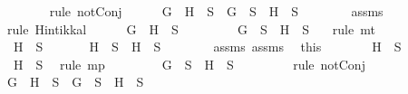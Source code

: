 \begin{isabellebody}
\ \ \ \ \ \ \isamarkupfalse%
\ {\isacharparenleft}rule\ notConj{}{\isacharparenright}\isanewline
\ \ \ \ \isamarkupfalse%
\ {\isachardoublequoteopen}G\ \isactrlbold {\isasymand}\ H\ {\isasymin}\ S\ {\isasymlongrightarrow}\ G\ {\isasymin}\ S\ {\isasymand}\ H\ {\isasymin}\ S{\isachardoublequoteclose}\isanewline
\ \ \ \ \ \ \isamarkupfalse%
\ assms{\isacharparenleft}{}{\isacharparenright}\ \isamarkupfalse%
\ {\isacharparenleft}rule\ Hintikka{\isacharunderscore}l{}{\isacharparenright}\isanewline
\ \ \ \ \isamarkupfalse%
\ {\isachardoublequoteopen}G\ \isactrlbold {\isasymand}\ H\ {\isasymnotin}\ S{\isachardoublequoteclose}\isanewline
\ \ \ \ \ \ \isamarkupfalse%
\ {\isacartoucheopen}{\isasymnot}\ {\isacharparenleft}G\ {\isasymin}\ S\ {\isasymand}\ H\ {\isasymin}\ S{\isacharparenright}{\isacartoucheclose}\ \ \isamarkupfalse%
\ {\isacharparenleft}rule\ mt{\isacharparenright}\isanewline
\ \ \isamarkupfalse%
\isanewline
\ \ \ \ \isamarkupfalse%
\ {\isachardoublequoteopen}\isactrlbold {\isasymnot}\ H\ {\isasymin}\ S{\isachardoublequoteclose}\isanewline
\ \ \ \ \isamarkupfalse%
\ {\isachardoublequoteopen}\isactrlbold {\isasymnot}\ H\ {\isasymin}\ S\ {\isasymlongrightarrow}\ H\ {\isasymnotin}\ S{\isachardoublequoteclose}\isanewline
\ \ \ \ \ \ \isamarkupfalse%
\ assms{\isacharparenleft}{}{\isacharparenright}\ assms{\isacharparenleft}{}{\isacharparenright}\ \isamarkupfalse%
\ this\isanewline
\ \ \ \ \isamarkupfalse%
\ \isamarkupfalse%
\ {\isachardoublequoteopen}H\ {\isasymnotin}\ S{\isachardoublequoteclose}\isanewline
\ \ \ \ \ \ \isamarkupfalse%
\ {\isacartoucheopen}\isactrlbold {\isasymnot}\ H\ {\isasymin}\ S{\isacartoucheclose}\ \isamarkupfalse%
\ {\isacharparenleft}rule\ mp{\isacharparenright}\isanewline
\ \ \ \ \isamarkupfalse%
\ \isamarkupfalse%
\ {\isachardoublequoteopen}{\isasymnot}\ {\isacharparenleft}G\ {\isasymin}\ S\ {\isasymand}\ H\ {\isasymin}\ S{\isacharparenright}{\isachardoublequoteclose}\ \isanewline
\ \ \ \ \ \ \isamarkupfalse%
\ {\isacharparenleft}rule\ notConj{}{\isacharparenright}\isanewline
\ \ \ \ \isamarkupfalse%
\ {\isachardoublequoteopen}G\ \isactrlbold {\isasymand}\ H\ {\isasymin}\ S\ {\isasymlongrightarrow}\ G\ {\isasymin}\ S\ {\isasymand}\ H\ {\isasymin}\ S{\isachardoublequoteclose}\isanewline

\end{isabellebody}
